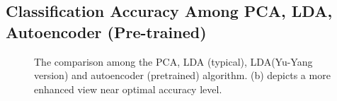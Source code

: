 \documentclass{article}
\begin{document}
\subsection{Classification Accuracy Among PCA, LDA, Autoencoder (Pre-trained)}
\begin{figure}[!htbp]
     \centering
     \captionsetup[subfigure]{labelformat=empty}
    \caption{The comparison among the PCA, LDA (typical), LDA(Yu-Yang version) and autoencoder (pretrained) algorithm. (b) depicts a more enhanced view near optimal accuracy level.}
    \label{fig:accuracy_1}
\end{figure}
\end{document}
